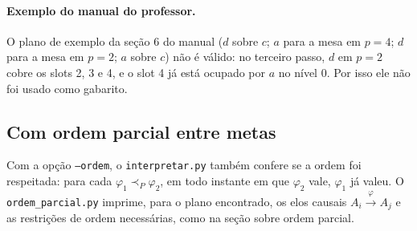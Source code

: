 \paragraph{Exemplo do manual do professor.} O plano de exemplo da seção 6 do manual ($d$ sobre $c$; $a$ para a mesa em $p=4$; $d$ para a mesa em $p=2$; $a$ sobre $c$) não é válido: no terceiro passo, $d$ em $p=2$ cobre os slots 2, 3 e 4, e o slot 4 já está ocupado por $a$ no nível 0. Por isso ele não foi usado como gabarito.

\subsection{Com ordem parcial entre metas}
Com a opção \texttt{--ordem}, o \texttt{interpretar.py} também confere se a ordem foi respeitada: para cada $\varphi_1\prec_P\varphi_2$, em todo instante em que $\varphi_2$ vale, $\varphi_1$ já valeu. O \texttt{ordem\_parcial.py} imprime, para o plano encontrado, os elos causais $A_i\xrightarrow{\varphi}A_j$ e as restrições de ordem necessárias, como na seção sobre ordem parcial.
